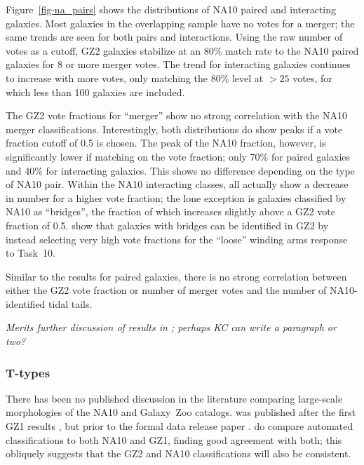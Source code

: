 \documentclass[useAMS,usenatbib]{mn2e}
\begin{document}
Figure~\ref{fig-na_pairs} shows the distributions of NA10 paired and interacting galaxies. Most galaxies in the overlapping sample have no votes for a merger; the same trends are seen for both pairs and interactions. Using the raw number of votes as a cutoff, GZ2 galaxies stabilize at an 80\% match rate to the NA10 paired galaxies for 8 or more merger votes. The trend for interacting galaxies continues to increase with more votes, only matching the 80\% level at $>25$ votes, for which less than 100 galaxies are included.

The GZ2 vote fractions for ``merger'' show no strong correlation with the NA10 merger classifications. Interestingly, both distributions do show peaks if a vote fraction cutoff of 0.5 is chosen. The peak of the NA10 fraction, however, is significantly lower if matching on the vote fraction; only 70\% for paired galaxies and 40\% for interacting galaxies. This shows no difference depending on the type of NA10 pair. Within the NA10 interacting classes, all actually show a decrease in number for a higher vote fraction; the lone exception is galaxies classified by NA10 as ``bridges'', the fraction of which increases slightly above a GZ2 vote fraction of 0.5. \citet{cas13} show that galaxies with bridges can be identified in GZ2 by instead selecting very high vote fractions for the ``loose'' winding arms response to Task~10. 

Similar to the results for paired galaxies, there is no strong correlation between either the GZ2 vote fraction or number of merger votes and the number of NA10-identified tidal tails. 

{\em Merits further discussion of results in \citet{cas13}; perhaps KC can write a paragraph or two?}

\subsubsection{T-types}

There has been no published discussion in the literature comparing large-scale morphologies of the NA10 and Galaxy~Zoo catalogs. \citet{nai10} was published after the first GZ1 results \citep{lin08}, but prior to the formal data release paper \citep{lin11}. \citet{hue11} do compare automated classifications to both NA10 and GZ1, finding good agreement with both; this obliquely suggests that the GZ2 and NA10 classifications will also be consistent. 
\end{document}
